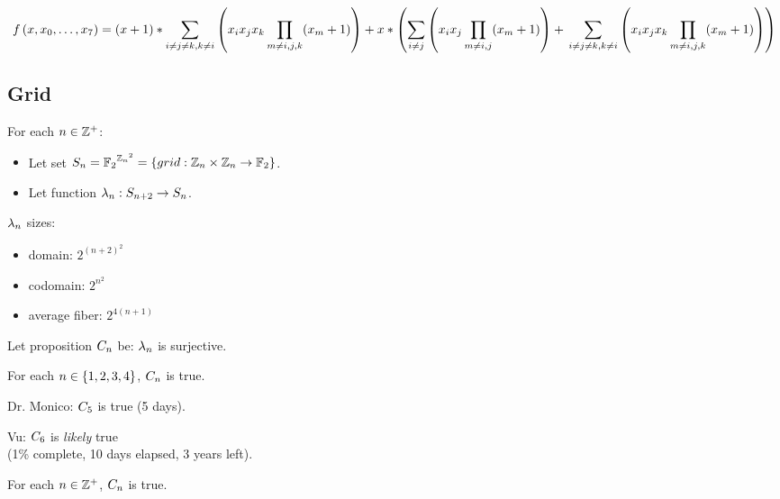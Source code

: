 \documentclass[letterpaper, 17pt]{extarticle}
\begin{document}
\begin{flushleft}
\begin{remark}
\begin{dmath*}
\lp = (\cell + 1) *
\sum_{i \ne j \ne k, k \ne i}\parentheses
{\cell_i \cell_j \cell_k
\prod_{m \ne i, j, k}(\cell_m + 1)} + \\
\cell * \parentheses
{\sum_{i \ne j}\parentheses
{\cell_i \cell_j \prod_{m \ne i, j}(\cell_m + 1)} + \\
\sum_{i \ne j \ne k, k \ne i}\parentheses
{\cell_i \cell_j \cell_k
\prod_{m \ne i, j, k}(\cell_m + 1)}}
\end{dmath*}
\end{remark}


\subsection{Grid}

\begin{definition}
For each $n \in \mathbb{Z}^+$:
\begin{itemize}
\item Let set $S_{n} = {\mathbb{F}_2}^{{\mathbb{Z}_n}^2} =
  \{grid: \mathbb{Z}_n \times \mathbb{Z}_n \to \mathbb{F}_2\}$.
\item Let function $\lambda_{n}: S_{n+2} \to S_{n}$.
\end{itemize}
\end{definition}

\begin{remark}
$\lambda_{n}$ sizes:
\begin{itemize}
\item domain: $2^{(n+2)^2}$
\item codomain: $2^{n^2}$
\item average fiber: $2^{4(n+1)}$
\end{itemize}
\end{remark}

\begin{definition}
Let proposition $C_{n}$ be: $\lambda_{n}$ is surjective.
\end{definition}

\begin{remark}
For each $n \in \{1, 2, 3, 4\}$, $C_{n}$ is true.
\end{remark}

\begin{remark}
Dr. Monico: $C_{5}$ is true (5 days).
\end{remark}

\begin{remark}
Vu: $C_{6}$ is \emph{likely} true \\
(1\% complete, 10 days elapsed, 3 years left).
\end{remark}

\begin{conjecture}
For each $n \in \mathbb{Z}^+$, $C_{n}$ is true.
\end{conjecture}


\end{flushleft}
\end{document}

